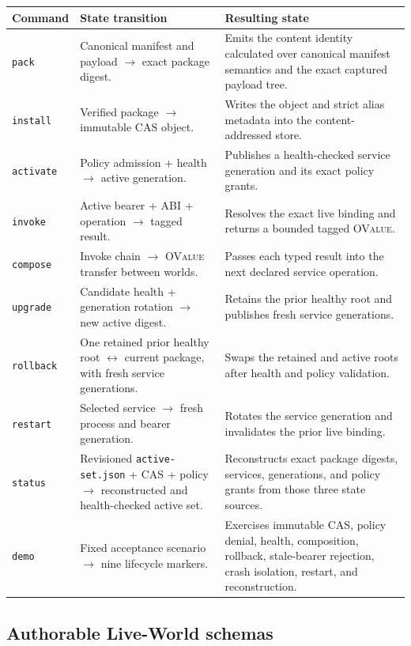 \documentclass[11pt,oneside]{article}
\newcommand{\ovalue}{\textsc{OValue}}
\begin{document}
\begin{longtable}{P{0.16\textwidth} P{0.34\textwidth} P{0.42\textwidth}}
\toprule
\textbf{Command} & \textbf{State transition} & \textbf{Resulting state} \\
\midrule
\endhead
\texttt{pack} & Canonical manifest and payload $\rightarrow$ exact package digest. &
Emits the content identity calculated over canonical manifest semantics and
the exact captured payload tree. \\
\texttt{install} & Verified package $\rightarrow$ immutable CAS object. &
Writes the object and strict alias metadata into the content-addressed store. \\
\texttt{activate} & Policy admission + health $\rightarrow$ active generation. &
Publishes a health-checked service generation and its exact policy grants. \\
\texttt{invoke} & Active bearer + ABI + operation $\rightarrow$ tagged result. &
Resolves the exact live binding and returns a bounded tagged \ovalue{}. \\
\texttt{compose} & Invoke chain $\rightarrow$ \ovalue{} transfer between worlds. &
Passes each typed result into the next declared service operation. \\
\texttt{upgrade} & Candidate health + generation rotation $\rightarrow$ new active digest. &
Retains the prior healthy root and publishes fresh service generations. \\
\texttt{rollback} & One retained prior healthy root $\leftrightarrow$ current
package, with fresh service generations. &
Swaps the retained and active roots after health and policy validation. \\
\texttt{restart} & Selected service $\rightarrow$ fresh process and bearer generation. &
Rotates the service generation and invalidates the prior live binding. \\
\texttt{status} & Revisioned \texttt{active-set.json} + CAS + policy
$\rightarrow$ reconstructed and health-checked active set. &
Reconstructs exact package digests, services, generations, and policy grants
from those three state sources. \\
\texttt{demo} & Fixed acceptance scenario $\rightarrow$ nine lifecycle markers. &
Exercises immutable CAS, policy denial, health, composition, rollback,
stale-bearer rejection, crash isolation, restart, and reconstruction. \\
\bottomrule
\end{longtable}

\subsection{Authorable Live-World schemas}
\end{document}

